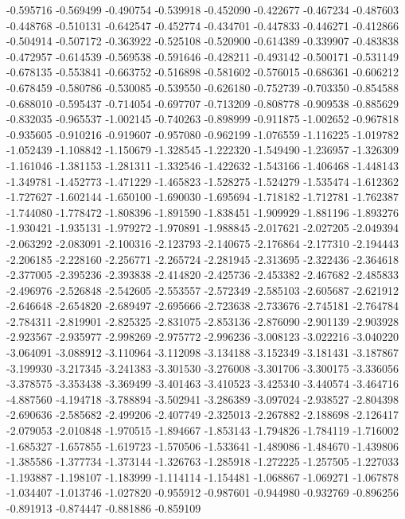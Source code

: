 -0.595716
-0.569499
-0.490754
-0.539918
-0.452090
-0.422677
-0.467234
-0.487603
-0.448768
-0.510131
-0.642547
-0.452774
-0.434701
-0.447833
-0.446271
-0.412866
-0.504914
-0.507172
-0.363922
-0.525108
-0.520900
-0.614389
-0.339907
-0.483838
-0.472957
-0.614539
-0.569538
-0.591646
-0.428211
-0.493142
-0.500171
-0.531149
-0.678135
-0.553841
-0.663752
-0.516898
-0.581602
-0.576015
-0.686361
-0.606212
-0.678459
-0.580786
-0.530085
-0.539550
-0.626180
-0.752739
-0.703350
-0.854588
-0.688010
-0.595437
-0.714054
-0.697707
-0.713209
-0.808778
-0.909538
-0.885629
-0.832035
-0.965537
-1.002145
-0.740263
-0.898999
-0.911875
-1.002652
-0.967818
-0.935605
-0.910216
-0.919607
-0.957080
-0.962199
-1.076559
-1.116225
-1.019782
-1.052439
-1.108842
-1.150679
-1.328545
-1.222320
-1.549490
-1.236957
-1.326309
-1.161046
-1.381153
-1.281311
-1.332546
-1.422632
-1.543166
-1.406468
-1.448143
-1.349781
-1.452773
-1.471229
-1.465823
-1.528275
-1.524279
-1.535474
-1.612362
-1.727627
-1.602144
-1.650100
-1.690030
-1.695694
-1.718182
-1.712781
-1.762387
-1.744080
-1.778472
-1.808396
-1.891590
-1.838451
-1.909929
-1.881196
-1.893276
-1.930421
-1.935131
-1.979272
-1.970891
-1.988845
-2.017621
-2.027205
-2.049394
-2.063292
-2.083091
-2.100316
-2.123793
-2.140675
-2.176864
-2.177310
-2.194443
-2.206185
-2.228160
-2.256771
-2.265724
-2.281945
-2.313695
-2.322436
-2.364618
-2.377005
-2.395236
-2.393838
-2.414820
-2.425736
-2.453382
-2.467682
-2.485833
-2.496976
-2.526848
-2.542605
-2.553557
-2.572349
-2.585103
-2.605687
-2.621912
-2.646648
-2.654820
-2.689497
-2.695666
-2.723638
-2.733676
-2.745181
-2.764784
-2.784311
-2.819901
-2.825325
-2.831075
-2.853136
-2.876090
-2.901139
-2.903928
-2.923567
-2.935977
-2.998269
-2.975772
-2.996236
-3.008123
-3.022216
-3.040220
-3.064091
-3.088912
-3.110964
-3.112098
-3.134188
-3.152349
-3.181431
-3.187867
-3.199930
-3.217345
-3.241383
-3.301530
-3.276008
-3.301706
-3.300175
-3.336056
-3.378575
-3.353438
-3.369499
-3.401463
-3.410523
-3.425340
-3.440574
-3.464716
-4.887560
-4.194718
-3.788894
-3.502941
-3.286389
-3.097024
-2.938527
-2.804398
-2.690636
-2.585682
-2.499206
-2.407749
-2.325013
-2.267882
-2.188698
-2.126417
-2.079053
-2.010848
-1.970515
-1.894667
-1.853143
-1.794826
-1.784119
-1.716002
-1.685327
-1.657855
-1.619723
-1.570506
-1.533641
-1.489086
-1.484670
-1.439806
-1.385586
-1.377734
-1.373144
-1.326763
-1.285918
-1.272225
-1.257505
-1.227033
-1.193887
-1.198107
-1.183999
-1.114114
-1.154481
-1.068867
-1.069271
-1.067878
-1.034407
-1.013746
-1.027820
-0.955912
-0.987601
-0.944980
-0.932769
-0.896256
-0.891913
-0.874447
-0.881886
-0.859109
